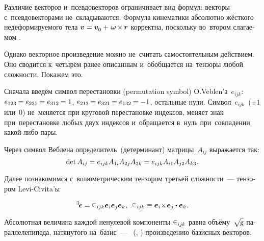 \begin{otherlanguage}{russian}
Различие векторов и~псевдовекторов ограничивает вид формул: векторы с~псевдовекторами не~складываются. Формула кинематики абсолютно жёсткого недеформируемого тела ${\bm{v} = \bm{v}_{\raisemath{-0.1em}{0}} + \hspace{.2ex} \bm{\omega} \hspace{-0.15ex}\times\hspace{-0.15ex} \bm{r}}$ корректна, поскольку во~втором слагаемом .

Однако векторное произведение можно не~считать самостоятельным действием. Оно сводится к~четырём ранее описанным и~обобщается на~тензоры любой сложности. Покажем это.

Сначала введём символ перестановки (permutation symbol) \hbox{O.\hspace{0.1ex}Veblen’а}~${e_{ijk}}$: ${e_{123} \hspace{-0.15ex}= e_{231} \hspace{-0.15ex}= e_{312} \hspace{-0.15ex}= 1}$, ${e_{213} \hspace{-0.15ex}= e_{321} \hspace{-0.15ex}= e_{132} \hspace{-0.15ex}= -1}$, остальные нули. Символ~${e_{ijk}}$~(${\pm 1}$ или~$0$) не~меняется при круговой перестановке индексов, меняет знак при~перестановке любых двух индексов и~обращается в~нуль при~совпадении какой\hbox{-}либо пары.

Через символ Веблена определитель~(детерминант) матрицы~${A_{ij}}$ выражается так:
\[ \operatorname{det} A_{ij} = e_{ijk} A_{1i} A_{2j} A_{3k} = e_{ijk} A_{i1} A_{j2} A_{k3} \hspace{.1ex} . \]

Далее познакомимся с~волюметрическим тензором третьей сложности~--- тензором Levi\hbox{-}Civita\hspace{-0.1ex}’ы

\nopagebreak\vspace{-0.1em}\begin{equation}\label{levicivitaintro}
\levicivitatensor = \levicivita_{ijk} \bm{e}_i \bm{e}_j \bm{e}_k \hspace{0.1ex}, \:\:
\levicivita_{ijk} \equiv \bm{e}_i \!\times\! \bm{e}_j \dotp \bm{e}_k \hspace{.1ex} .
\end{equation}

Абсолютная величина каждой ненулевой компоненты ${\levicivita_{ijk}}$
равна объёму~\!${\sqrt{\hspace{-0.36ex}\mathstrut{\textsl{g}}}}$ параллелепипеда, натянутого на~базис~---
~(, ) произведению базисных векторов.


\end{otherlanguage}
